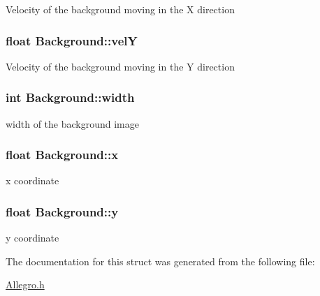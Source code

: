 \label{structBackground_a3baf341baf83315a91f694bafebf3a0e}
Velocity of the background moving in the X direction \hypertarget{structBackground_a012729329c3eaaf671374116d9336fba}{
\subsubsection[{velY}]{\setlength{\rightskip}{0pt plus 5cm}float {\bf Background::velY}}}
\label{structBackground_a012729329c3eaaf671374116d9336fba}
Velocity of the background moving in the Y direction \hypertarget{structBackground_a43297fc8fceec13bed4e292a45bf564d}{
\subsubsection[{width}]{\setlength{\rightskip}{0pt plus 5cm}int {\bf Background::width}}}
\label{structBackground_a43297fc8fceec13bed4e292a45bf564d}
width of the background image \hypertarget{structBackground_af6650023418d2982420370f87eeff2de}{
\subsubsection[{x}]{\setlength{\rightskip}{0pt plus 5cm}float {\bf Background::x}}}
\label{structBackground_af6650023418d2982420370f87eeff2de}
x coordinate \hypertarget{structBackground_adb462ce7dc04d3b09698f1baa3d173e6}{
\subsubsection[{y}]{\setlength{\rightskip}{0pt plus 5cm}float {\bf Background::y}}}
\label{structBackground_adb462ce7dc04d3b09698f1baa3d173e6}
y coordinate 

The documentation for this struct was generated from the following file:\begin{DoxyCompactItemize}
\item 
\hyperlink{Allegro_8h}{Allegro.h}\end{DoxyCompactItemize}
